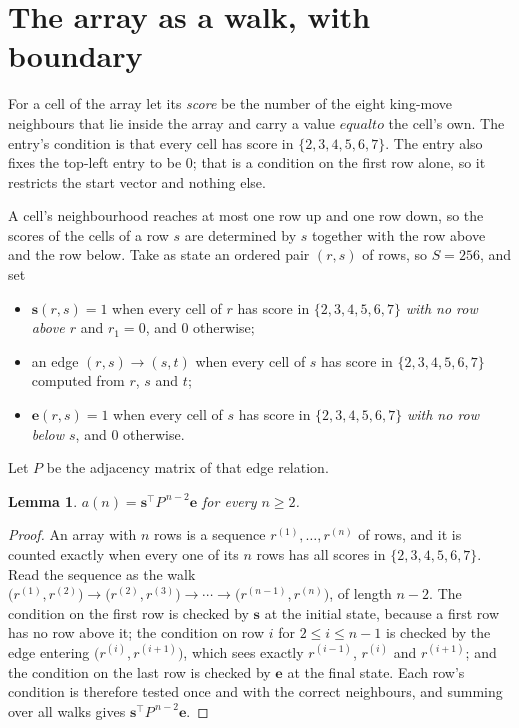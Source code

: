 \documentclass[11pt,a4paper]{article}
\theoremstyle{plain}
\newtheorem{lemma}[theorem]{Lemma}
\theoremstyle{definition}
\begin{document}
\section{The array as a walk, with boundary}

For a cell of the array let its \emph{score} be the number of the eight king-move neighbours that lie inside
the array and carry a value $equal to$ the cell's own. The entry's condition is that every cell
has score in $\{2,3,4,5,6,7\}$. The entry also fixes the top-left entry to be $0$; that is a condition on the first row alone, so it restricts the start vector and nothing else.

A cell's neighbourhood reaches at most one row up and one row down, so the scores of the
cells of a row $s$ are determined by $s$ together with the row above and the row below.
Take as state an ordered pair $(r,s)$ of rows, so $S=256$, and set
\begin{itemize}
\item $\mathbf{s}(r,s)=1$ when every cell of $r$ has score in $\{2,3,4,5,6,7\}$ \emph{with no row
above $r$} and $r_1=0$, and $0$ otherwise;
\item an edge $(r,s)\to(s,t)$ when every cell of $s$ has score in $\{2,3,4,5,6,7\}$ computed from
$r$, $s$ and $t$;
\item $\mathbf{e}(r,s)=1$ when every cell of $s$ has score in $\{2,3,4,5,6,7\}$ \emph{with no row
below $s$}, and $0$ otherwise.
\end{itemize}
Let $P$ be the adjacency matrix of that edge relation.

\begin{lemma}\label{lem:walk}
$a(n)=\mathbf{s}^{\!\top}P^{\,n-2}\mathbf{e}$ for every $n\ge2$.
\end{lemma}

\begin{proof}
An array with $n$ rows is a sequence $r^{(1)},\dots,r^{(n)}$ of rows, and it is counted
exactly when every one of its $n$ rows has all scores in $\{2,3,4,5,6,7\}$. Read the sequence as the
walk $\bigl(r^{(1)},r^{(2)}\bigr)\to\bigl(r^{(2)},r^{(3)}\bigr)\to\cdots\to
\bigl(r^{(n-1)},r^{(n)}\bigr)$, of length $n-2$. The condition on the first row is
checked by $\mathbf{s}$ at the initial state, because a first row has no row above it; the
condition on row $i$ for $2\le i\le n-1$ is checked by the edge entering
$\bigl(r^{(i)},r^{(i+1)}\bigr)$, which sees exactly $r^{(i-1)}$, $r^{(i)}$ and
$r^{(i+1)}$; and the condition on the last row is checked by $\mathbf{e}$ at the final
state. Each row's condition is therefore tested once and with the correct neighbours, and
summing over all walks gives $\mathbf{s}^{\!\top}P^{\,n-2}\mathbf{e}$.
\end{proof}
\end{document}
